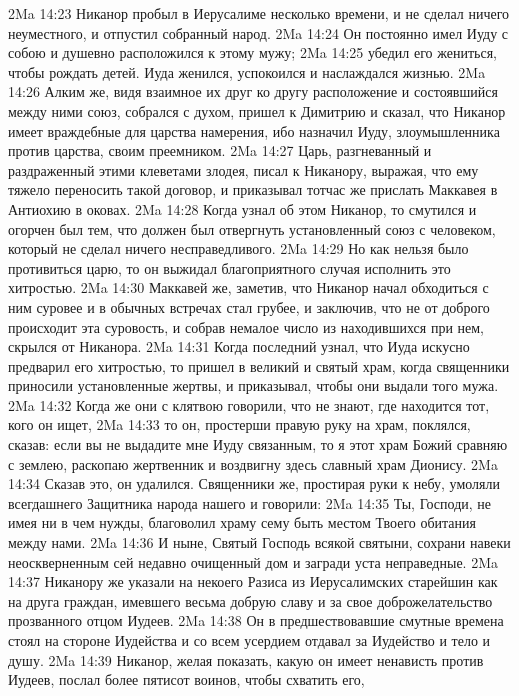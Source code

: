 \vs 2Ma 14:23 Никанор пробыл в Иерусалиме несколько времени, и не сделал ничего неуместного, и отпустил собранный народ.
\vs 2Ma 14:24 Он постоянно имел Иуду с собою и душевно расположился к этому мужу;
\vs 2Ma 14:25 убедил его жениться, чтобы рождать детей. Иуда женился, успокоился и наслаждался жизнью.
\vs 2Ma 14:26 Алким же, видя взаимное их друг ко другу расположение и состоявшийся между ними союз, собрался с духом, пришел к Димитрию и сказал, что Никанор имеет враждебные для царства намерения, ибо назначил Иуду, злоумышленника против царства, своим преемником.
\vs 2Ma 14:27 Царь, разгневанный и раздраженный этими клеветами злодея, писал к Никанору, выражая, что ему тяжело переносить такой договор, и приказывал тотчас же прислать Маккавея в Антиохию в оковах.
\vs 2Ma 14:28 Когда узнал об этом Никанор, то смутился и огорчен был тем, что должен был отвергнуть установленный союз с человеком, который не сделал ничего несправедливого.
\vs 2Ma 14:29 Но как нельзя было противиться царю, то он выжидал благоприятного случая исполнить это хитростью.
\rsbpar\vs 2Ma 14:30 Маккавей же, заметив, что Никанор начал обходиться с ним суровее и в обычных встречах стал грубее, и заключив, что не от доброго происходит эта суровость, и собрав немалое число из находившихся при нем, скрылся от Никанора.
\vs 2Ma 14:31 Когда последний узнал, что Иуда искусно предварил его хитростью, то пришел в великий и святый храм, когда священники приносили установленные жертвы, и приказывал, чтобы они выдали того мужа.
\vs 2Ma 14:32 Когда же они с клятвою говорили, что не знают, где находится тот, кого он ищет,
\vs 2Ma 14:33 то он, простерши правую руку на храм, поклялся, сказав: если вы не выдадите мне Иуду связанным, то я этот храм Божий сравняю с землею, раскопаю жертвенник и воздвигну здесь славный храм Дионису.
\vs 2Ma 14:34 Сказав это, он удалился. Священники же, простирая руки к небу, умоляли всегдашнего Защитника народа нашего и говорили:
\vs 2Ma 14:35 Ты, Господи, не имея ни в чем нужды, благоволил храму сему быть местом Твоего обитания между нами.
\vs 2Ma 14:36 И ныне, Святый Господь всякой святыни, сохрани навеки неоскверненным сей недавно очищенный дом и загради уста неправедные.
\rsbpar\vs 2Ma 14:37 Никанору же указали на некоего Разиса из Иерусалимских старейшин как на друга граждан, имевшего весьма добрую славу и за свое доброжелательство прозванного отцом Иудеев.
\vs 2Ma 14:38 Он в предшествовавшие смутные времена стоял на стороне Иудейства и со всем усердием отдавал за Иудейство и тело и душу.
\vs 2Ma 14:39 Никанор, желая показать, какую он имеет ненависть против Иудеев, послал более пятисот воинов, чтобы схватить его,
